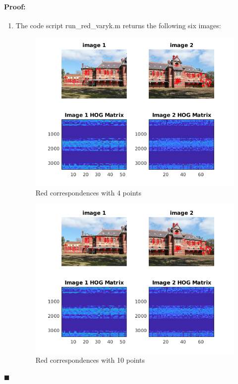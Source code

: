 \documentclass[12pt]{article}
\newenvironment{proof}{\paragraph{Proof: }}{\hfill$\blacksquare$}
\begin{document}
\begin{proof}
\begin{enumerate}
\item The code script run\_red\_varyk.m returns the following six images:

\begin{figure}[H]
\begin{center}
\advance\leftskip-3cm
\advance\rightskip-3cm
\includegraphics[keepaspectratio=true, scale = 1.3]{red_showcorrespondences_4.png}
\caption{Red correspondences with 4 points}
\label{visina8}
\end{center}
\end{figure}

\begin{figure}[H]
\begin{center}
\advance\leftskip-3cm
\advance\rightskip-3cm
\includegraphics[keepaspectratio=true, scale = 1.3]{red_showcorrespondences_10.png}
\caption{Red correspondences with 10 points}
\label{visina8}
\end{center}
\end{figure}


\end{enumerate}
\end{proof}
\end{document}

